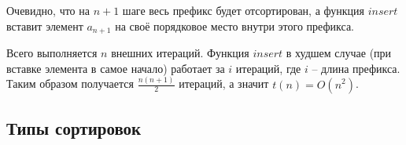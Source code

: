     \begin{proof_cor}
        Очевидно, что на $n + 1$ шаге весь префикс будет отсортирован, а функция $insert$ вставит элемент $a_{n+1}$ на своё порядковое место внутри этого префикса.
    \end{proof_cor}

    \begin{proof_time}
        Всего выполняется $n$ внешних итераций. Функция $insert$ в худшем случае (при вставке элемента в самое начало) работает за $i$ итераций, где $i$ -- длина префикса. Таким образом получается $\frac{n(n+1)}{2}$ итераций, а значит $t(n) = O(n^2)$. 
    \end{proof_time}

\subsection{Типы сортировок}

